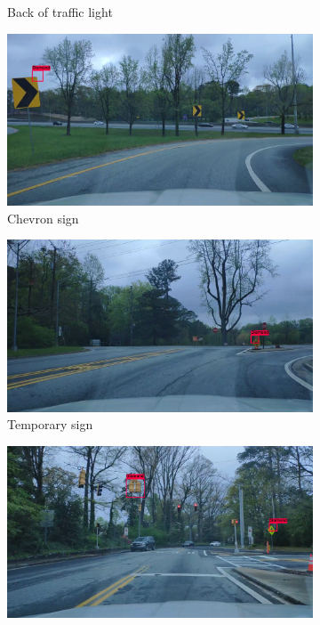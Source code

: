\begin{figure}
\begin{center}
\begin{subfigure}[t]{.49\linewidth}
      \caption{Back of traffic light}
      \label{fig:wwTraffficLight1FP}
    \end{subfigure}
    \begin{subfigure}[t]{.49\linewidth}
      \centering
      \includegraphics[width=0.99\linewidth]{figures/examples/westwestley/FP/FP07.jpg}
      \caption{Chevron sign}
      \label{fig:wwChevron2FP}
    \end{subfigure}
    \begin{subfigure}[t]{.49\linewidth}
      \centering
      \includegraphics[width=0.99\linewidth]{figures/examples/westwestley/FP/FP08.png}
      \caption{Temporary sign}
      \label{fig:wwTemporaryTP}
    \end{subfigure}
    \begin{subfigure}[t]{.49\linewidth}
      \centering
      \includegraphics[width=0.99\linewidth]{figures/examples/westwestley/FP/FP09.png}

\end{subfigure}
\end{center}
\end{figure}
